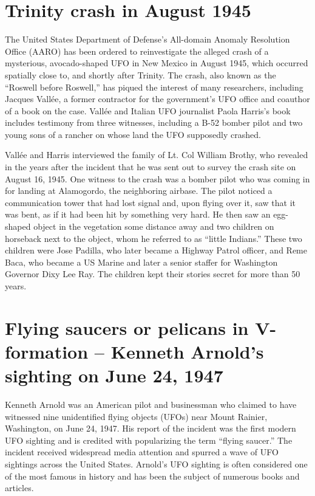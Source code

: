 \section{Trinity crash in August 1945}

\label{2023-UFO-part-History-chapter-post-1945-pre-1953.tex-tc1945}

The United States Department of Defense's All-domain Anomaly Resolution Office (AARO)
has been ordered to reinvestigate the alleged crash of a mysterious,
avocado-shaped UFO in New Mexico in August 1945, which occurred spatially close to, and shortly after Trinity.
The crash, also known as the ``Roswell before Roswell,''
has piqued the interest of many researchers, including Jacques Vall\'ee,
a former contractor for the government's UFO office and coauthor of a book on the case.
Vall\'ee and Italian UFO journalist Paola Harris's book~\cite{Vallee2021May} includes testimony from three witnesses,
including a B-52 bomber pilot and two young sons of a rancher on whose land the UFO supposedly crashed.

Vall\'ee and Harris interviewed the family of Lt. Col William Brothy,
who revealed in the years after the incident that he was sent out to survey the crash site on August 16, 1945. One witness to the crash was a bomber pilot who was coming in for landing at Alamogordo, the neighboring airbase. The pilot noticed a communication tower that had lost signal and, upon flying over it, saw that it was bent, as if it had been hit by something very hard. He then saw an egg-shaped object in the vegetation some distance away and two children on horseback next to the object, whom he referred to as ``little Indians.'' These two children were Jose Padilla, who later became a Highway Patrol officer, and Reme Baca, who became a US Marine and later a senior staffer for Washington Governor Dixy Lee Ray. The children kept their stories secret for more than 50 years.

\section{Flying saucers or pelicans in V-formation -- Kenneth Arnold's sighting on June 24, 1947}

\label{2023-UFO-part-History-chapter-post-1945-pre-1947-KA}

Kenneth Arnold was an American pilot and businessman who claimed to have witnessed nine unidentified flying objects (UFOs) near Mount Rainier, Washington, on June 24, 1947. His report of the incident was the first modern UFO sighting and is credited with popularizing the term ``flying saucer.'' The incident received widespread media attention and spurred a wave of UFO sightings across the United States. Arnold's UFO sighting is often considered one of the most famous in history and has been the subject of numerous books and articles.

